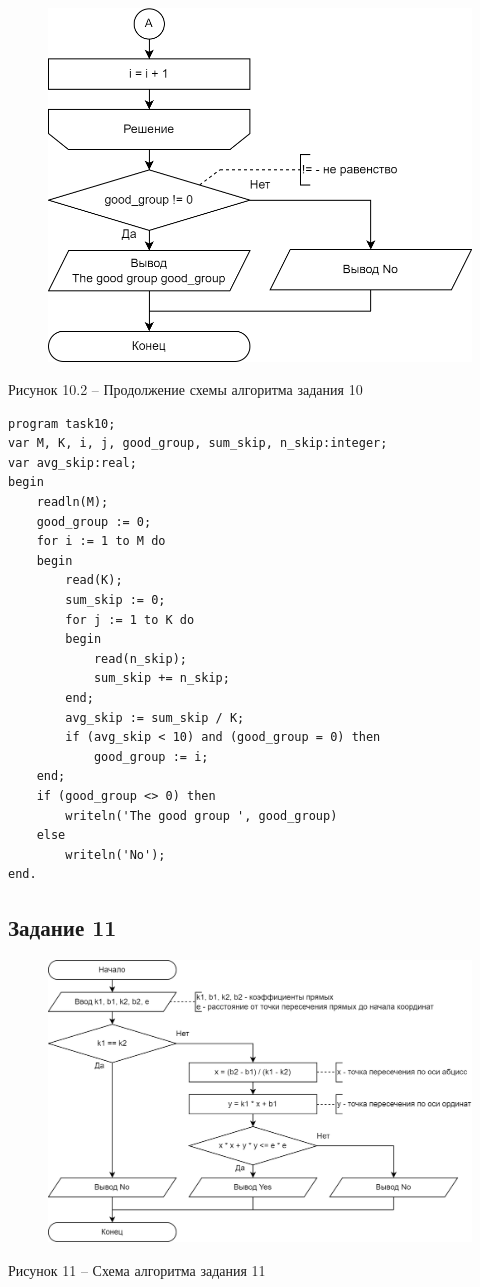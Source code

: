 \documentclass[a4paper,14pt]{extarticle}
\begin{document}
	\begin{figure}[h]
		\centering
		\includegraphics[width=0.55\linewidth]{schemes/t-10-2}
	\end{figure}
	\begin{center}
		Рисунок 10.2 – Продолжение схемы алгоритма задания 10
	\end{center}
	
	\begin{lstlisting}
program task10;
var M, K, i, j, good_group, sum_skip, n_skip:integer;
var avg_skip:real;
begin
    readln(M);
    good_group := 0;
    for i := 1 to M do
    begin
        read(K);
        sum_skip := 0;
        for j := 1 to K do
        begin
            read(n_skip);
            sum_skip += n_skip;
        end;
        avg_skip := sum_skip / K;
        if (avg_skip < 10) and (good_group = 0) then
            good_group := i;
    end;
    if (good_group <> 0) then
        writeln('The good group ', good_group)
    else
        writeln('No');
end.
	\end{lstlisting}
	
	\subsection*{Задание 11}
	\begin{figure}[h]
		\centering
		\includegraphics[width=0.6\linewidth]{schemes/t-11}
	\end{figure}
	\begin{center}
		Рисунок 11 – Схема алгоритма задания 11
	\end{center}
	
\end{document}

